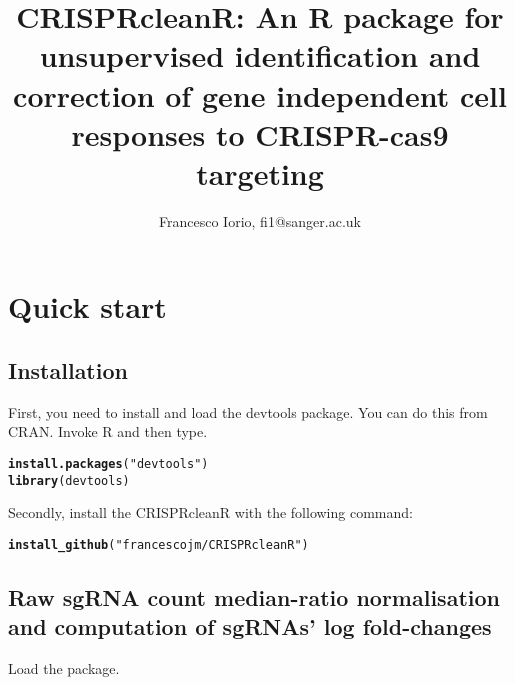 \documentclass{article}\usepackage[]{graphicx}\usepackage[]{color}
\makeatletter
\newcommand{\hlstr}[1]{\textcolor[rgb]{0.192,0.494,0.8}{#1}}%
\newcommand{\hlstd}[1]{\textcolor[rgb]{0.345,0.345,0.345}{#1}}%
\newcommand{\hlkwd}[1]{\textcolor[rgb]{0.737,0.353,0.396}{\textbf{#1}}}%
\newenvironment{kframe}{%
 \def\at@end@of@kframe{}%
 \ifinner\ifhmode%
  \def\at@end@of@kframe{\end{minipage}}%
  \begin{minipage}{\columnwidth}%
 \fi\fi%
 \def\FrameCommand##1{\hskip\@totalleftmargin \hskip-\fboxsep
 \colorbox{shadecolor}{##1}\hskip-\fboxsep
     \hskip-\linewidth \hskip-\@totalleftmargin \hskip\columnwidth}%
 \MakeFramed {\advance\hsize-\width
   \@totalleftmargin\z@ \linewidth\hsize
   \@setminipage}}%
 {\par\unskip\endMakeFramed%
 \at@end@of@kframe}
\newenvironment{knitrout}{}{} %
\makeatother
\begin{document}
\title{CRISPRcleanR: An R package for unsupervised identification and correction of gene independent cell responses to CRISPR-cas9 targeting}
\author{Francesco Iorio, fi1@sanger.ac.uk}
\maketitle
\section{Quick start}

\subsection{Installation}

First, you need to install and load the devtools package. You can do this from CRAN. Invoke R and then type.

\begin{knitrout}
\color{fgcolor}\begin{kframe}
\begin{alltt}
\hlkwd{install.packages}\hlstd{(}\hlstr{"devtools"}\hlstd{)}
\hlkwd{library}\hlstd{(devtools)}
\end{alltt}
\end{kframe}
\end{knitrout}

Secondly, install the CRISPRcleanR with the following command:

\begin{knitrout}
\color{fgcolor}\begin{kframe}
\begin{alltt}
\hlkwd{install_github}\hlstd{(}\hlstr{"francescojm/CRISPRcleanR"}\hlstd{)}
\end{alltt}
\end{kframe}
\end{knitrout}

\subsection{Raw sgRNA count median-ratio normalisation and computation of sgRNAs' log fold-changes}

Load the package.
\end{document}
